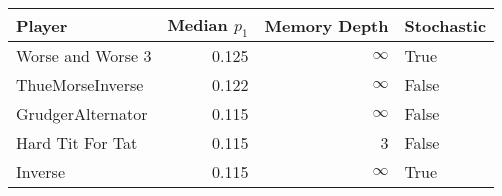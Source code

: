 \begin{tabular}{lrrl}
\toprule
            Player &  Median $p_1$ &  Memory Depth & Stochastic \\
\midrule
 Worse and Worse 3 &         0.125 &            \(\infty\) &       True \\
  ThueMorseInverse &         0.122 &            \(\infty\) &      False \\
 GrudgerAlternator &         0.115 &            \(\infty\) &      False \\
  Hard Tit For Tat &         0.115 &             3 &      False \\
           Inverse &         0.115 &            \(\infty\) &       True \\
\bottomrule
\end{tabular}
